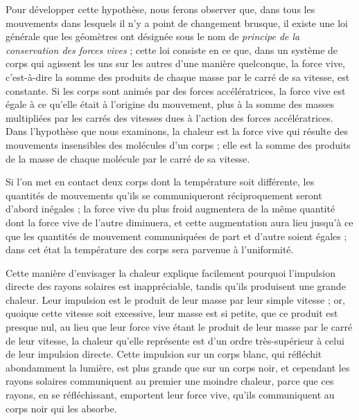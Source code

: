 	Pour développer cette hypothèse, nous ferons observer que, dans tous les mouvements dans lesquels il n’y a point de changement brusque, il existe une loi générale que les géomètres ont désignée sous le nom de \textit{principe de la conservation des forces vives} ; cette loi consiste en ce que, dans un système de corps qui agissent les uns sur les autres d’une manière quelconque, la force vive, c’est-à-dire la somme des produits de chaque masse par le carré de sa vitesse, est constante. Si les corps sont animés par des forces accélératrices, la force vive est égale à ce qu’elle était à l’origine du mouvement, plus à la somme des masses multipliées par les carrés des vitesses dues à l’action des forces accélératrices. Dans l’hypothèse que nous examinons, la chaleur est la force vive qui résulte des mouvements insensibles des molécules d’un corps ; elle est la somme des produits de la masse de chaque molécule par le carré de sa vitesse.

	Si l’on met en contact deux corps dont la température soit différente, les quantités de mouvements qu’ils se communiqueront réciproquement seront d’abord inégales ; la force vive du plus froid augmentera de la même quantité dont la force vive de l’autre diminuera, et cette augmentation aura lieu jusqu’à ce que les quantités de mouvement communiquées de part et d’autre soient égales ; dans cet état la température des corps sera parvenue à l’uniformité.

	Cette manière d’envisager la chaleur explique facilement pourquoi l’impulsion directe des rayons solaires est inappréciable, tandis qu’ils produisent une grande chaleur. Leur impulsion est le produit de leur masse par leur simple vitesse ; or, quoique cette vitesse soit excessive, leur masse est si petite, que ce produit est presque nul, au lieu que leur force vive étant le produit de leur masse par le carré de leur vitesse, la chaleur qu’elle représente est d’un ordre très-supérieur à celui de leur impulsion directe. Cette impulsion sur un corps blanc, qui réfléchit abondamment la lumière, est plus grande que sur un corps noir, et cependant les rayons solaires communiquent au premier une moindre chaleur, parce que ces rayons, en se réfléchissant, emportent leur force vive, qu’ils communiquent au corps noir qui les absorbe.

